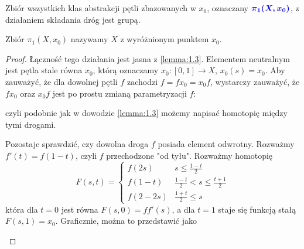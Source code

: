 \begin{theorem}[$\pi_1(X, x_0)$]\label{twierdzenie:1.4}
  Zbiór wszystkich klas abstrakcji pętli zbazowanych w $x_0$, oznaczany $\color{blue}\boldsymbol{\pi_1(X, x_0)}$, z działaniem składania dróg jest grupą. 
\end{theorem}

Zbiór $\pi_1(X, x_0)$ nazywamy  $X$ z wyróżnionym punktem $x_0$.

\begin{proof}
  Łączność tego działania jest jasna z \ref{lemma:1.3}. Elementem neutralnym jest pętla stale równa $x_0$, którą oznaczamy $x_0:[0,1]\to X$, $x_0(s)=x_0$. Aby zauważyć, że dla dowolnej pętli $f$ zachodzi $f=fx_0=x_0f$, wystarczy zauważyć, że $fx_0$ oraz $x_0f$ jest po prostu zmianą parametryzacji $f$:
  \begin{center}
  \end{center}
  czyli podobnie jak w dowodzie \ref{lemma:1.3} możemy napisać homotopię między tymi drogami.

  Pozostaje sprawdzić, czy dowolna droga $f$ posiada element odwrotny. Rozważmy $f'(t)=f(1-t)$, czyli $f$ przechodzone "od tyłu". Rozważmy homotopię 
  $$F(s, t)=\begin{cases}
    f(2s) & s\leq \frac{1-t}{2}\\ 
    f(1-t) & \frac{1-t}{2}<s\leq \frac{t+1}{2}\\ 
    f(2-2s) & \frac{1+t}{2}\leq s
  \end{cases}$$
  która dla $t=0$ jest równa $F(s, 0)=ff'(s)$, a dla $t=1$ staje się funkcją stałą $F(s, 1)=x_0$. Graficznie, można to przedstawić jako
  \begin{center}
  \end{center}
\end{proof}

